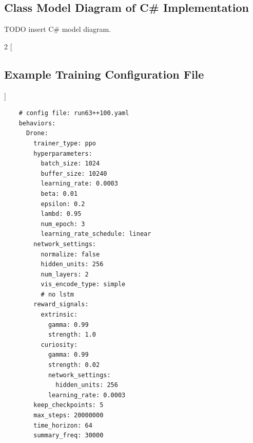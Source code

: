 \newpage

\subsection{Class Model Diagram of C\# Implementation}

TODO insert C\# model diagram.



\newpage
\begin{multicols}{2}
[
\subsection{Example Training Configuration File}\label{appendix:ppo-trainer}
]
\begin{verbatim}
    # config file: run63++100.yaml
    behaviors:
      Drone:
        trainer_type: ppo
        hyperparameters:
          batch_size: 1024
          buffer_size: 10240
          learning_rate: 0.0003
          beta: 0.01
          epsilon: 0.2
          lambd: 0.95
          num_epoch: 3
          learning_rate_schedule: linear
        network_settings:
          normalize: false
          hidden_units: 256
          num_layers: 2
          vis_encode_type: simple
          # no lstm
        reward_signals:
          extrinsic:
            gamma: 0.99
            strength: 1.0
          curiosity:
            gamma: 0.99
            strength: 0.02
            network_settings:
              hidden_units: 256
            learning_rate: 0.0003
        keep_checkpoints: 5
        max_steps: 20000000
        time_horizon: 64
        summary_freq: 30000
\end{verbatim}
\columnbreak


\end{multicols}

